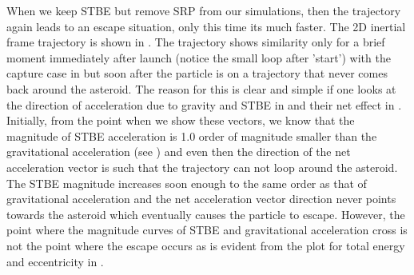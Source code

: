 When we keep \gls{STBE} but remove \gls{SRP} from our simulations, then the trajectory again leads to an escape situation, only this time its much faster. The 2D inertial frame trajectory is shown in . The trajectory shows similarity only for a brief moment immediately after launch (notice the small loop after 'start') with the capture case in  but soon after the particle is on a trajectory that never comes back around the asteroid. The reason for this is clear and simple if one looks at the direction of acceleration due to gravity and \gls{STBE} in  and their net effect in . Initially, from the point when we show these vectors, we know that the magnitude of \gls{STBE} acceleration is 1.0 order of magnitude smaller than the gravitational acceleration (see ) and even then the direction of the net acceleration vector is such that the trajectory can not loop around the asteroid. The \gls{STBE} magnitude increases soon enough to the same order as that of gravitational acceleration and the net acceleration vector direction never points towards the asteroid which eventually causes the particle to escape. However, the point where the magnitude curves of \gls{STBE} and gravitational acceleration cross is not the point where the escape occurs as is evident from the plot for total energy and eccentricity in .

